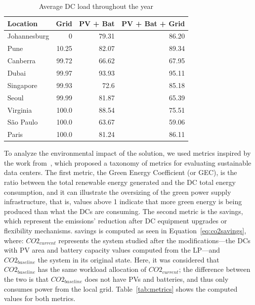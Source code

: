 \begin{table}[h]
  
  \caption{Average DC load throughout the year }\label{tab:dcutilization} \centering

  \begin{tabular}{|l|r|r|r|}
   \hline
    
  \textbf{Location} &   \textbf{Grid} & \textbf{PV + Bat} & \textbf{PV + Bat + Grid}  \\
  \hline
  Johannesburg & 0 & 79.31  & 86.20  \\
  \hline
  Pune  & 10.25 &  82.07 & 89.34   \\
  \hline
  Canberra  & 99.72 & 66.62 & 67.95 \\
  \hline
  Dubai   & 99.97 & 93.93 & 95.11   \\
  \hline
  Singapore & 99.93 & 72.6  & 85.18 \\
  \hline     
  Seoul    & 99.99 & 81.87 & 65.39      \\
  \hline
  Virginia   & 100.0 & 88.54 & 75.51 \\
  \hline
  São Paulo   & 100.0 & 63.67 & 59.06 \\
  \hline 
  Paris    & 100.0 & 81.24  &  86.11    \\
  \hline  

\end{tabular}  
\end{table}


To analyze the environmental impact of the solution, we used metrics inspired by the work from~\citet{reddy2017_metrics}, which proposed a taxonomy of metrics for evaluating sustainable data centers. The first metric, the Green Energy Coefficient (or GEC), is the ratio between the total renewable energy generated and the DC total energy consumption, and it can illustrate the oversizing of the green power supply infrastructure, that is, values above 1 indicate that more green energy is being produced than what the DCs are consuming. The second metric is the  savings, which represent the emissions' reduction after DC equipment upgrades or flexibility mechanisms.  savings is computed as seen in Equation~\ref{eq:co2savings}, where: $CO2_{current}$ represents the system studied after the modifications---the DCs with PV area and battery capacity values computed from the LP---and $CO2_{baseline}$ the system in its original state. Here, it was considered that $CO2_{baseline}$ has the same workload allocation of  $CO2_{current}$; the difference between the two is that  $CO2_{baseline}$ does not have PVs and batteries, and thus only consumes power from the local grid. Table~\ref{tab:metrics} shows the computed values for both metrics.


